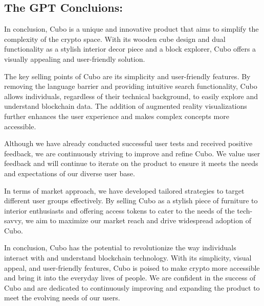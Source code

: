\documentclass{report}
\begin{document}
\subsection{The GPT Concluions:}

In conclusion, Cubo is a unique and innovative product that aims to simplify the complexity of the crypto space. With its wooden cube design and dual functionality as a stylish interior decor piece and a block explorer, Cubo offers a visually appealing and user-friendly solution.

The key selling points of Cubo are its simplicity and user-friendly features. By removing the language barrier and providing intuitive search functionality, Cubo allows individuals, regardless of their technical background, to easily explore and understand blockchain data. The addition of augmented reality visualizations further enhances the user experience and makes complex concepts more accessible.

Although we have already conducted successful user tests and received positive feedback, we are continuously striving to improve and refine Cubo. We value user feedback and will continue to iterate on the product to ensure it meets the needs and expectations of our diverse user base.

In terms of market approach, we have developed tailored strategies to target different user groups effectively. By selling Cubo as a stylish piece of furniture to interior enthusiasts and offering access tokens to cater to the needs of the tech-savvy, we aim to maximize our market reach and drive widespread adoption of Cubo.

In conclusion, Cubo has the potential to revolutionize the way individuals interact with and understand blockchain technology. With its simplicity, visual appeal, and user-friendly features, Cubo is poised to make crypto more accessible and bring it into the everyday lives of people. We are confident in the success of Cubo and are dedicated to continuously improving and expanding the product to meet the evolving needs of our users.
\end{document}

